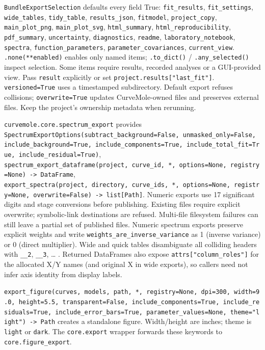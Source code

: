 \documentclass[
  10pt,
  a4paper,
  oneside]{scrreprt}
\begin{document}
\texttt{BundleExportSelection} defaults every field True:
\texttt{fit\_results}, \texttt{fit\_settings}, \texttt{wide\_tables},
\texttt{tidy\_table}, \texttt{results\_json}, \texttt{fitmodel},
\texttt{project\_copy}, \texttt{main\_plot\_png},
\texttt{main\_plot\_svg}, \texttt{html\_summary},
\texttt{html\_reproducibility}, \texttt{pdf\_summary},
\texttt{uncertainty}, \texttt{diagnostics}, \texttt{readme},
\texttt{laboratory\_notebook}, \texttt{spectra},
\texttt{function\_parameters}, \texttt{parameter\_covariances},
\texttt{current\_view}. \texttt{.none(**enabled)} enables only named
items; \texttt{.to\_dict()} / \texttt{.any\_selected()} inspect
selection. Some items require results, recorded analyses or a
GUI-provided view. Pass \texttt{result} explicitly or set
\texttt{project.results{[}"last\_fit"{]}}. \texttt{versioned=True} uses
a timestamped subdirectory. Default export refuses collisions;
\texttt{overwrite=True} updates CurveMole-owned files and preserves
external files. Keep the project's ownership metadata when rerunning.

\texttt{curvemole.core.spectrum\_export} provides
\texttt{SpectrumExportOptions(subtract\_background=False,\ unmasked\_only=False,\ include\_background=True,\ include\_components=True,\ include\_total\_fit=True,\ include\_residual=True)},
\texttt{spectrum\_export\_dataframe(project,\ curve\_id,\ *,\ options=None,\ registry=None)\ -\textgreater{}\ DataFrame},
\texttt{export\_spectra(project,\ directory,\ curve\_ids,\ *,\ options=None,\ registry=None,\ overwrite=False)\ -\textgreater{}\ list{[}Path{]}}.
Numeric exports use 17 significant digits and stage conversions before
publishing. Existing files require explicit overwrite; symbolic-link
destinations are refused. Multi-file filesystem failures can still leave
a partial set of published files. Numeric spectrum exports preserve
explicit weights and write \texttt{weights\_are\_inverse\_variance} as 1
(inverse variance) or 0 (direct multiplier). Wide and quick tables
disambiguate all colliding headers with \texttt{\_\_2}, \texttt{\_\_3},
\ldots{} . Returned DataFrames also expose
\texttt{attrs{[}"column\_roles"{]}} for the allocated X/Y names (and
original X in wide exports), so callers need not infer axis identity
from display labels.

\texttt{export\_figure(curves,\ models,\ path,\ *,\ registry=None,\ dpi=300,\ width=9.0,\ height=5.5,\ transparent=False,\ include\_components=True,\ include\_residuals=True,\ include\_error\_bars=True,\ parameter\_values=None,\ theme="light")\ -\textgreater{}\ Path}
creates a standalone figure. Width/height are inches; theme is
\texttt{light} or \texttt{dark}. The \texttt{core.export} wrapper
forwards these keywords to \texttt{core.figure\_export}.
\end{document}
